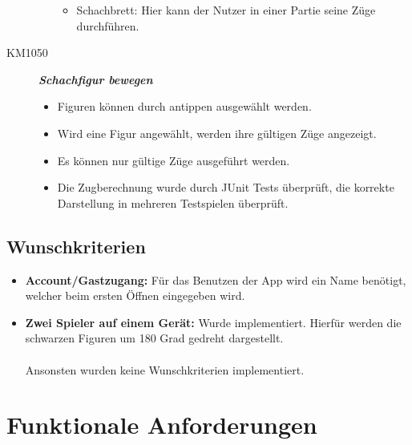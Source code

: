 \documentclass[parskip=full]{scrartcl}
\begin{document}
\begin{description}
\begin{itemize}
\begin{itemize}
			\item Schachbrett: Hier kann der Nutzer in einer Partie seine Züge durchführen.
			
		\end{itemize}
	\end{itemize}
	\item[KM1050] \textbf{\textit{Schachfigur bewegen}}
	\begin{itemize}
		\item Figuren können durch antippen ausgewählt werden.
		\item Wird eine Figur angewählt, werden ihre gültigen Züge angezeigt.
		\item Es können nur gültige Züge ausgeführt werden.
		\item Die Zugberechnung wurde durch JUnit Tests überprüft, die korrekte Darstellung in mehreren Testspielen überprüft.
	\end{itemize}
\end{description}
\subsection{Wunschkriterien}
\begin{itemize}
\item{\textbf{Account/Gastzugang:}} Für das Benutzen der App wird ein Name benötigt, welcher beim ersten Öffnen eingegeben wird. 
\item{\textbf{Zwei Spieler auf einem Gerät:}} Wurde implementiert. Hierfür werden die schwarzen Figuren um 180 Grad gedreht dargestellt. \\
\\
Ansonsten wurden keine Wunschkriterien implementiert.
\end{itemize}
	\section{Funktionale Anforderungen}
\end{document}
